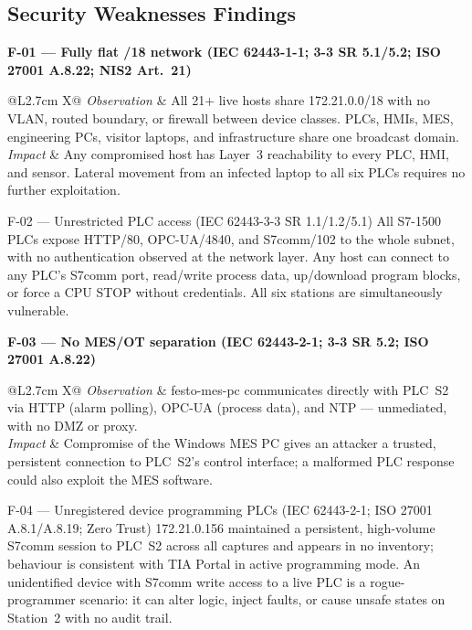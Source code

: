 \documentclass{report}
\begin{document}
\pagebreak

\subsection{Security Weaknesses Findings}

\newcommand{\finding}[4]{%
\par\smallskip\noindent\textbf{#1}\\[2pt]
\begin{tabularx}{\linewidth}{@{}L{2.7cm} X@{}}
\textit{Observation} & #2 \\
\textit{Impact} & #3 \\
\end{tabularx}\par}


\finding{F-01 --- Fully  flat /18 network (IEC 62443-1-1; 3-3 SR 5.1/5.2; ISO 27001 A.8.22; NIS2 Art.~21)}
{All 21+ live hosts share 172.21.0.0/18 with no VLAN, routed boundary, or firewall between device classes. PLCs, HMIs, MES, engineering PCs, visitor laptops, and infrastructure share one broadcast domain.}
{Any compromised host has Layer~3 reachability to every PLC, HMI, and sensor. Lateral movement from an infected laptop to all six PLCs requires no further exploitation.}

\finding{F-02 --- Unrestricted PLC access (IEC 62443-3-3 SR 1.1/1.2/5.1)}
{All S7-1500 PLCs expose HTTP/80, OPC-UA/4840, and S7comm/102 to the whole subnet, with no authentication observed at the network layer.}
{Any host can connect to any PLC's S7comm port, read/write process data, up/download program blocks, or force a CPU STOP without credentials. All six stations are simultaneously vulnerable.}

\finding{F-03 --- No MES/OT separation (IEC 62443-2-1; 3-3 SR 5.2; ISO 27001 A.8.22)}
{festo-mes-pc communicates directly with PLC~S2 via HTTP (alarm polling), OPC-UA (process data), and NTP --- unmediated, with no DMZ or proxy.}
{Compromise of the Windows MES PC gives an attacker a trusted, persistent connection to PLC~S2's control interface; a malformed PLC response could also exploit the MES software.}

\finding{F-04 --- Unregistered device programming PLCs (IEC 62443-2-1; ISO 27001 A.8.1/A.8.19; Zero Trust)}
{172.21.0.156 maintained a persistent, high-volume S7comm session to PLC~S2 across all captures and appears in no inventory; behaviour is consistent with TIA Portal in active programming mode.}
{An unidentified device with S7comm write access to a live PLC is a rogue-programmer scenario: it can alter logic, inject faults, or cause unsafe states on Station~2 with no audit trail.}
\end{document}
